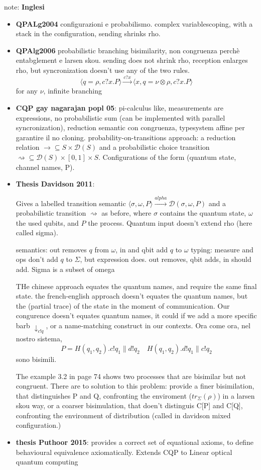 \documentclass[10pt,a4paper, titlepage]{report}
\newcommand{\note}[1]{{\color{red} #1}}
\newcommand{\distr}{\mathcal{D}}
\begin{document}
\note{note:}
\note{\textbf{Inglesi}}
\begin{itemize}
\item \textbf{QPALg2004} configurazioni e probabilismo. complex variablescoping, with a stack in the configuration, sending shrinks rho. 

\item \textbf{QPAlg2006} probabilistic branching bisimilarity, non congruenza perchè entabglement e larsen skou. sending does not shrink rho, reception enlarges rho, but syncronization doesn't use any of the two rules. 
\[ \langle q = \rho, c?x.P \rangle \xrightarrow{c?x} \langle x,q = \nu\otimes\rho, c?x.P \rangle
\]
for any $\nu$, infinite branching


\item \textbf{CQP gay nagarajan popl 05}: pi-calculus like, measurements are expressions, no probabilistic sum (can be implemented with parallel syncronization), reduction semantic con congruenza, typesystem affine per garantire il no cloning. probability-on-transitions approach: a reduction relation $\rightarrow \subseteq S \times \distr(S)$ and a probabilistic choice transition $\rightsquigarrow \subseteq \distr(S)\times [0, 1] \times S$. Configurations of the form (quantum state, channel names, P).

\item \textbf{Thesis Davidson 2011}:

Gives a labelled transition semantic $\langle \sigma, \omega, P\rangle \xrightarrow{alpha} \distr(\sigma, \omega, P)$ and a probabilistic transition  $\rightsquigarrow$ as before, where $\sigma$ contains the quantum state, $\omega$ the used qubits, and $P$ the process. Quantum input doesn't extend rho (here called sigma).

semantics: out removes $q$ from $\omega$, in and qbit add $q$ to $\omega$ 
typing: measure and ops don't add $q$ to $\Sigma$, but expression does. out removes, qbit adds, in should add. 
Sigma is a subset of omega

THe chinese approach equates the quantum names, and require the same final state.
the french-english approach doesn't equates the quantum names, but the (partial trace) of the state in the moment of communication.
Our congurence doesn't equates quantum names, it could if we add a more specific barb $\downarrow_{c!q}$, or a name-matching construct in our contexts. 
Ora come ora, nel nostro sistema, 
\[ P = H(q_1, q_2).c!q_1 \parallel d!q_2 \quad H(q_1, q_2).d!q_1 \parallel c!q_2\]
sono bisimili.

The example 3.2 in page 74 shows two processes that are bisimilar but not congruent. There are to solution to this problem: provide a finer bisimilation, that distinguishes P and Q, confronting the enviroment ($tr_\Sigma(\rho)$) in a larsen skou way, or a coarser bisimulation, that doen't distinguis C[P] and C[Q], confronting the environment of distribution (called in davidson mixed configuration.)


\item \textbf{thesis Puthoor 2015}:
provides a correct set of equational axioms, to define behavioural equivalence axiomatically. Extends CQP to Linear optical quantum computing
\end{itemize}
\end{document}
